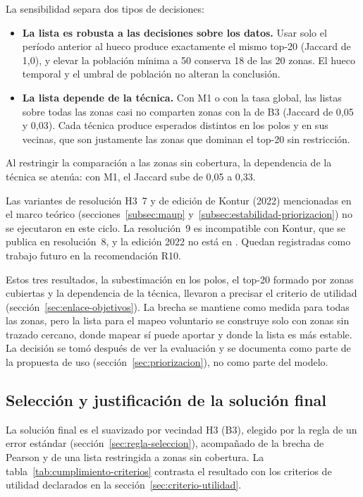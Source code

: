 La sensibilidad separa dos tipos de decisiones:
\begin{itemize}
  \item \textbf{La lista es robusta a las decisiones sobre los datos.} Usar solo el período
        anterior al hueco produce exactamente el mismo top-20 (Jaccard de 1,0), y elevar la
        población mínima a 50 conserva 18 de las 20 zonas. El hueco temporal y el umbral de
        población no alteran la conclusión.
  \item \textbf{La lista depende de la técnica.} Con M1 o con la tasa global, las listas
        sobre todas las zonas casi no comparten zonas con la de B3 (Jaccard de 0,05 y
        0,03). Cada técnica produce esperados distintos en los polos y en sus vecinas, que
        son justamente las zonas que dominan el top-20 sin restricción.
\end{itemize}
Al restringir la comparación a las zonas sin cobertura, la dependencia de la técnica se
atenúa: con M1, el Jaccard sube de 0,05 a 0,33.

Las variantes de resolución H3~7 y de edición de Kontur (2022) mencionadas en el marco
teórico (secciones~\ref{subsec:maup} y~\ref{subsec:estabilidad-priorizacion}) no se
ejecutaron en este ciclo. La resolución~9 es incompatible con Kontur, que se publica en
resolución~8, y la edición 2022 no está en . Quedan registradas como trabajo
futuro en la recomendación R10.

Estos tres resultados, la subestimación en los polos, el top-20 formado por zonas
cubiertas y la dependencia de la técnica, llevaron a precisar el criterio de utilidad
(sección~\ref{sec:enlace-objetivos}). La brecha se mantiene como medida para todas las
zonas, pero la lista para el mapeo voluntario se construye solo con zonas sin trazado
cercano, donde mapear sí puede aportar y donde la lista es más estable. La decisión se
tomó después de ver la evaluación y se documenta como parte de la propuesta de uso
(sección~\ref{sec:priorizacion}), no como parte del modelo.

\subsection{Selección y justificación de la solución final}
\label{sec:seleccion-final}

La solución final es el suavizado por vecindad H3 (B3), elegido por la regla de un error
estándar (sección~\ref{sec:regla-seleccion}), acompañado de la brecha de Pearson y de una
lista restringida a zonas sin cobertura. La tabla~\ref{tab:cumplimiento-criterios}
contrasta el resultado con los criterios de utilidad declarados en la
sección~\ref{sec:criterio-utilidad}.

